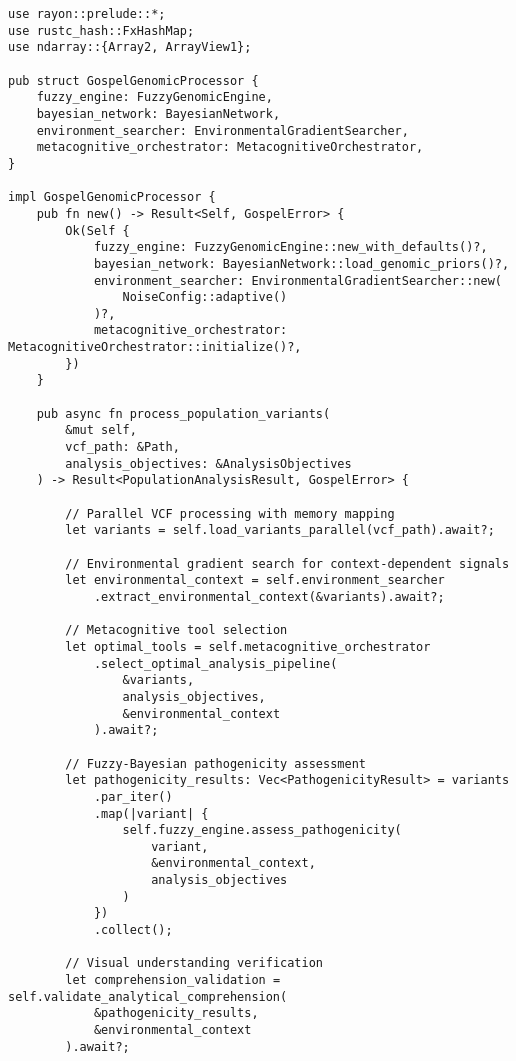 \documentclass[12pt,a4paper]{article}
\begin{document}
\begin{lstlisting}[style=ruststyle, caption=High-Performance Genomic Processing Core]
use rayon::prelude::*;
use rustc_hash::FxHashMap;
use ndarray::{Array2, ArrayView1};

pub struct GospelGenomicProcessor {
    fuzzy_engine: FuzzyGenomicEngine,
    bayesian_network: BayesianNetwork,
    environment_searcher: EnvironmentalGradientSearcher,
    metacognitive_orchestrator: MetacognitiveOrchestrator,
}

impl GospelGenomicProcessor {
    pub fn new() -> Result<Self, GospelError> {
        Ok(Self {
            fuzzy_engine: FuzzyGenomicEngine::new_with_defaults()?,
            bayesian_network: BayesianNetwork::load_genomic_priors()?,
            environment_searcher: EnvironmentalGradientSearcher::new(
                NoiseConfig::adaptive()
            )?,
            metacognitive_orchestrator: MetacognitiveOrchestrator::initialize()?,
        })
    }
    
    pub async fn process_population_variants(
        &mut self, 
        vcf_path: &Path,
        analysis_objectives: &AnalysisObjectives
    ) -> Result<PopulationAnalysisResult, GospelError> {
        
        // Parallel VCF processing with memory mapping
        let variants = self.load_variants_parallel(vcf_path).await?;
        
        // Environmental gradient search for context-dependent signals
        let environmental_context = self.environment_searcher
            .extract_environmental_context(&variants).await?;
        
        // Metacognitive tool selection
        let optimal_tools = self.metacognitive_orchestrator
            .select_optimal_analysis_pipeline(
                &variants, 
                analysis_objectives,
                &environmental_context
            ).await?;
        
        // Fuzzy-Bayesian pathogenicity assessment
        let pathogenicity_results: Vec<PathogenicityResult> = variants
            .par_iter()
            .map(|variant| {
                self.fuzzy_engine.assess_pathogenicity(
                    variant,
                    &environmental_context,
                    analysis_objectives
                )
            })
            .collect();
        
        // Visual understanding verification
        let comprehension_validation = self.validate_analytical_comprehension(
            &pathogenicity_results,
            &environmental_context
        ).await?;
        

\end{lstlisting}
\end{document}
